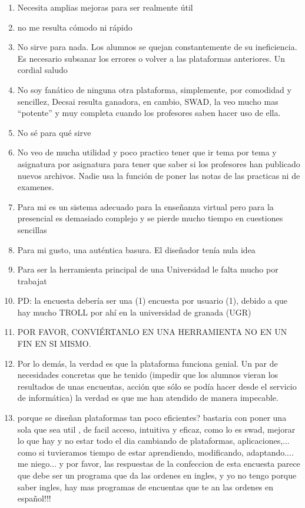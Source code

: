 \begin{enumerate}
\item Necesita amplias mejoras para ser realmente útil
\item no me resulta cómodo ni rápido
\item No sirve para nada. Los alumnos se quejan constantemente de su ineficiencia. Es necesario subsanar los errores o volver a las plataformas anteriores. Un cordial saludo
\item No soy fanático de ninguna otra plataforma, simplemente, por comodidad y sencillez, Decsai resulta ganadora, en cambio, SWAD, la veo mucho mas ``potente'' y muy completa cuando los profesores saben hacer uso de ella. 
\item No sé para qué sirve
\item No veo de mucha utilidad y poco practico tener que ir tema por tema y asignatura por asignatura para tener que saber si los profesores han publicado nuevos archivos. Nadie usa la función de poner las notas de las practicas ni de examenes.
\item Para mi es un sistema adecuado para la enseñanza virtual pero para la presencial es demasiado complejo y se pierde mucho tiempo en cuestiones sencillas
\item Para mi gusto, una auténtica basura. El diseñador tenía nula idea
\item Para ser la herramienta principal de una Universidad le falta mucho por trabajat
\item PD: la encuesta debería ser una (1) encuesta por usuario (1), debido a que hay mucho TROLL por ahí en la universidad de granada (UGR)
\item POR FAVOR, CONVIÉRTANLO EN UNA HERRAMIENTA NO EN UN FIN EN SI MISMO.
\item Por lo demás, la verdad es que la plataforma funciona genial. Un par de necesidades concretas que he tenido (impedir que los alumnos vieran los resultados de unas encuentas, acción que sólo se podía hacer desde el servicio de informática) la verdad es que me han atendido de manera impecable.
\item porque se diseñan plataformas tan poco eficientes? bastaria con poner una sola que sea util , de facil acceso, intuitiva y eficaz, como lo es swad, mejorar lo que hay y no estar todo el dia cambiando de plataformas, aplicaciones,... como si tuvieramos tiempo de estar aprendiendo, modificando, adaptando.... me niego... y por favor, las respuestas de la confeccion de esta encuesta parece que debe ser un programa que da las ordenes en ingles, y yo no tengo porque saber ingles, hay mas programas de encuentas que te an las ordenes en español!!!

\end{enumerate}

